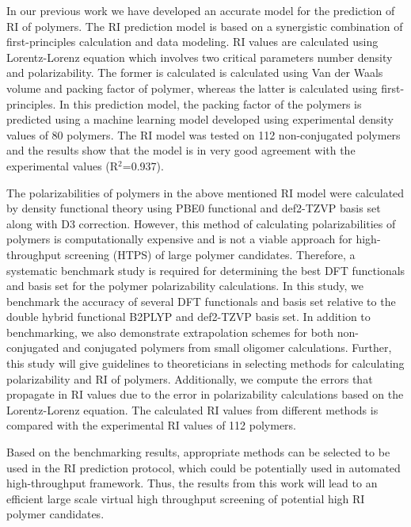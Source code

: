 In our previous work we have developed an accurate model for the prediction of RI of polymers. The RI prediction model is based on a synergistic combination of first-principles calculation and data modeling. RI values are calculated using Lorentz-Lorenz equation which involves two critical parameters number density and polarizability. The former is calculated is calculated using Van der Waals volume and packing factor of polymer, whereas the latter is calculated using first-principles. In this prediction model, the packing factor of the polymers is predicted using a machine learning model developed using experimental density values of 80 polymers. The RI model was tested on 112 non-conjugated polymers and the results show that the model is in very good agreement with the experimental values (R$^2$=0.937).

The polarizabilities of polymers in the above mentioned RI model were calculated by density functional theory using PBE0 functional and def2-TZVP basis set along with D3 correction. However, this method of calculating polarizabilities of polymers is computationally expensive and is not a viable approach for high-throughput screening (HTPS) of large polymer candidates. Therefore, a systematic benchmark study is required for determining the best DFT functionals and basis set for the polymer polarizability calculations. In this study, we benchmark the accuracy of several DFT functionals and basis set relative to the double hybrid functional B2PLYP and def2-TZVP basis set. In addition to benchmarking, we also demonstrate extrapolation schemes for both non-conjugated and conjugated polymers from small oligomer calculations. Further, this study will give guidelines to theoreticians in selecting methods for calculating polarizability and RI of polymers. Additionally, we compute the errors that propagate in RI values due to the error in polarizability calculations based on the Lorentz-Lorenz equation. The calculated RI values from different methods is compared with the experimental RI values of 112 polymers.

Based on the benchmarking results, appropriate methods can be selected to be used in the RI prediction protocol, which could be potentially used in automated high-throughput framework. Thus, the results from this work will lead to an efficient large scale virtual high throughput screening of potential high RI polymer candidates.

